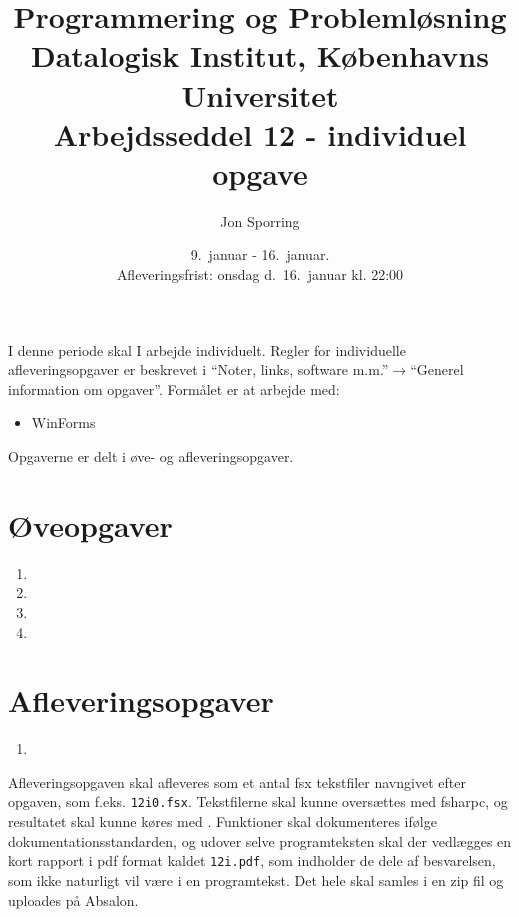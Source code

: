 \documentclass[a4paper,12pt]{article}
\title{Programmering og Problemløsning\\Datalogisk Institut,
  Københavns Universitet\\Arbejdsseddel 12 - individuel opgave}
\author{Jon Sporring}
\date{9.\ januar - 16.\ januar.\\Afleveringsfrist: onsdag d.\ 16.\ januar kl. 22:00}
\begin{document}
\maketitle

I denne periode skal I arbejde individuelt. Regler for individuelle afleveringsopgaver er beskrevet i "`Noter, links, software m.m."'$\rightarrow$"`Generel information om opgaver"'. Formålet er at arbejde med:
\begin{itemize}
\item WinForms
\end{itemize}

Opgaverne er delt i øve- og afleveringsopgaver. 
\section*{Øveopgaver}
\begin{enumerate}[label=12ø.\arabic*,start=0]
\item 
\item 
\item 
\item 
\end{enumerate}

\section*{Afleveringsopgaver}
\begin{enumerate}[label=12i.\arabic*,start=0]
\item 
\end{enumerate}

Afleveringsopgaven skal afleveres som et antal fsx tekstfiler navngivet efter opgaven, som f.eks. \lstinline!12i0.fsx!. Tekstfilerne skal kunne oversættes med fsharpc, og resultatet skal kunne køres med . Funktioner skal dokumenteres ifølge dokumentationsstandarden, og udover selve programteksten skal der vedlægges en kort rapport i pdf format kaldet \lstinline{12i.pdf}, som indholder de dele af besvarelsen, som ikke naturligt vil være i en programtekst. Det hele skal samles i en zip fil og uploades på Absalon.
\end{document}
